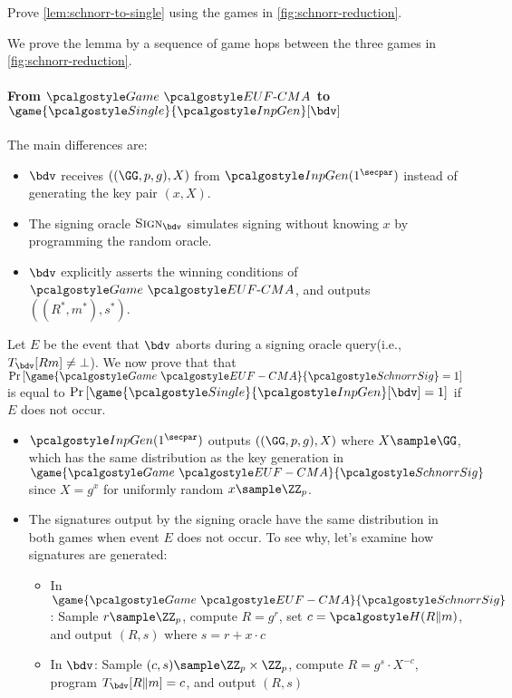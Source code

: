 \begin{exercise}\label{ex:schnorr-to-single}
  Prove \autoref{lem:schnorr-to-single} using the games in \autoref{fig:schnorr-reduction}.
\end{exercise}

\ifsolutions
\begin{mysolution}
  We prove the lemma by a sequence of game hops between the three games in \autoref{fig:schnorr-reduction}.

  \paragraph{From $\Game~\algo{EUF\text{-}CMA}$ to $\game{\algo{Single}}{\algo{InpGen}}[\bdv]$}
  The main differences are:
  \begin{itemize}
    \item $\bdv$ receives $((\GG, p, g), X)$ from $\algo{InpGen}(1^\secpar)$ instead of generating the key pair $(x, X)$.
    \item The signing oracle $\pcoracle{Sign}_{\bdv}$ simulates signing without knowing $x$ by programming the random oracle.
    \item $\bdv$ explicitly asserts the winning conditions of $\Game~\algo{EUF\text{-}CMA}$, and outputs $((R^*, m^*), s^*)$.
  \end{itemize}

  Let $E$ be the event that $\bdv$ aborts during a signing oracle query(i.e., $T_{\bdv}[R  m] \neq \bot$).
  We now prove that that $\pr{\game{\Game~\algo{EUF-CMA}}{\algo{SchnorrSig}} = 1}$ is equal to $\pr{\game{\algo{Single}}{\algo{InpGen}}[\bdv] = 1}$ if $E$ does not occur.
  \begin{itemize}
    \item $\algo{InpGen}(1^\secpar)$ outputs $((\GG, p, g), X)$ where $X \sample \GG$, which has the same distribution as the key generation in $\game{\Game~\algo{EUF-CMA}}{\algo{SchnorrSig}}$ since $X = g^x$ for uniformly random $x \sample \ZZ_p$.
    \item The signatures output by the signing oracle have the same distribution in both games when event $E$ does not occur. To see why, let's examine how signatures are generated:
    \begin{itemize}
      \item In $\game{\Game~\algo{EUF-CMA}}{\algo{SchnorrSig}}$: Sample $r \sample \ZZ_p$, compute $R = g^r$, set $c = \algo{H}(R \| m)$, and output $(R,
  s)$ where $s = r + x \cdot c$
      \item In $\bdv$: Sample $(c, s) \sample \ZZ_p \times \ZZ_p$, compute $R = g^s \cdot X^{-c}$, program $T_{\bdv}[R \| m] = c$, and output $(R, s)$
    \end{itemize}


\end{itemize}
\end{mysolution}

